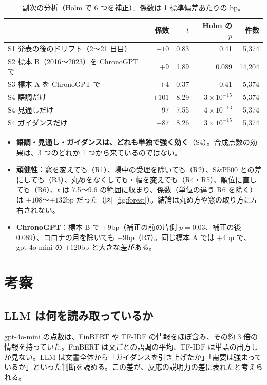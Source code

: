 \documentclass[xelatex,ja=standard,jafont=haranoaji,a4paper,10pt,openany]{bxjsreport}
\newcommand{\figref}[1]{図~\ref{#1}}
\begin{document}
\begin{table}[htbp]
\centering
\caption{副次の分析（Holm で 6 つを補正）。係数は 1 標準偏差あたりの bp。}
\label{tab:secondary}
\small
\begin{tabular}{lrrrr}
\toprule
& 係数 & $t$ & Holm の $p$ & 件数 \\
\midrule
S1 発表の後のドリフト（2〜21 日目） & $+10$ & 0.83 & 0.41 & 5,374 \\
S2 標本 B（2016〜2023）を ChronoGPT で & $+9$ & 1.89 & 0.089 & 14,204 \\
S3 標本 A を ChronoGPT で & $+4$ & 0.37 & 0.41 & 5,374 \\
S4 語調だけ & $+101$ & 8.29 & $3\times10^{-15}$ & 5,374 \\
S4 見通しだけ & $+97$ & 7.55 & $4\times10^{-13}$ & 5,374 \\
S4 ガイダンスだけ & $+87$ & 8.26 & $3\times10^{-15}$ & 5,374 \\
\bottomrule
\end{tabular}
\end{table}

\begin{itemize}
\item \textbf{語調・見通し・ガイダンスは、どれも単独で強く効く}（S4）。合成点数の効果は、3 つのどれか 1 つから来ているのではない。
\item \textbf{頑健性}：窓を変えても（R1）、場中の受理を除いても（R2）、S\&P500 との差にしても（R3）、丸めをなくしても・幅を変えても（R4・R5）、順位に直しても（R6）、$t$ は 7.5〜9.6 の範囲に収まり、係数（単位の違う R6 を除く）は $+108$〜$+132$bp だった（\figref{fig:forest}）。結論は丸め方や窓の取り方に左右されない。
\item \textbf{ChronoGPT}：標本 B で $+9$bp（補正の前の片側 $p=0.03$、補正の後 0.089）、コロナの月を除いても $+9$bp（R7）。同じ標本 A では $+4$bp で、gpt-4o-mini の $+120$bp と大きな差がある。
\end{itemize}

\chapter{考察}\label{ch:discussion}

\section{LLM は何を読み取っているか}

gpt-4o-mini の点数は、FinBERT や TF-IDF の情報をほぼ含み、その約 3 倍の情報を持っていた。FinBERT は文ごとの語調の平均、TF-IDF は単語の出方しか見ない。LLM は文書全体から「ガイダンスを引き上げたか」「需要は強まっているか」といった判断を読める。この差が、反応の説明力の差に表れたと考えられる。
\end{document}
